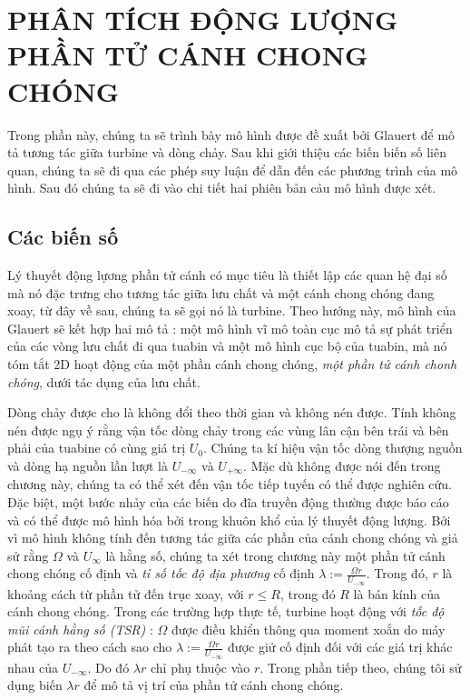 \documentclass[a4paper,twoside,13pt]{extbook}
\begin{document}
\chapter{PHÂN TÍCH ĐỘNG LƯỢNG PHẦN TỬ CÁNH CHONG CHÓNG}

Trong phần này, chúng ta sẽ trình bày mô hình được đề xuất bởi Glauert để mô tả tương tác giữa turbine và dòng chảy. Sau khi giới thiệu các biến biến số liên quan, chúng ta sẽ đi qua các phép suy luận để dẫn đến các phương trình của mô hình. Sau đó chúng ta sẽ đi vào chi tiết hai phiên bản cảu mô hình được xét.

\section{Các biến số}

Lý thuyết động lựơng phần tử cánh có mục tiêu là thiết lập các quan hệ đại số mà nó đặc trưng cho tương tác giữa lưu chất và một cánh chong chóng đang xoay, từ đây về sau, chúng ta sẽ gọi nó là turbine. Theo hướng này, mô hình của Glauert sẽ kết hợp hai mô tả : một mô hình vĩ mô toàn cục mô tả sự phát triển của các vòng lưu chất đi qua tuabin và một mô hình cục bộ của tuabin, mà nó tóm tắt 2D hoạt động của một phần cánh chong chóng, \emph{một phần tử cánh chonh chóng}, dưới tác dụng của lưu chất.

Dòng chảy được cho là không đổi theo thời gian và không nén được. Tính không nén được ngụ ý rằng vận tốc dòng chảy trong các vùng lân cận bên trái và bên phải của tuabine có cùng giá trị $U_0$. Chúng ta kí hiệu vận tốc dòng thượng nguồn và dòng hạ nguồn lần lượt là $U_{-\infty}$ và $U_{+\infty}$. Mặc dù không được nói đến trong chương này, chúng ta có thể xét đến vận tốc tiếp tuyến có thể được nghiên cứu. Đặc biệt, một bước nhảy của các biến do đĩa truyền động thường được báo cáo và có thể được mô hình hóa bởi trong khuôn khổ của lý thuyết động lượng. Bởi vì mô hình không tính đến tương tác giữa các phần của cánh chong chóng và giả sử rằng $\Omega$ và $U_{\infty}$ là hằng số, chúng ta xét trong chương này một phần tử cánh chong chóng cố định và \emph{tỉ số tốc độ địa phương} cố định $\displaystyle\lambda := \frac{\Omega r}{U_{-\infty}}$. Trong đó, $r$ là khoảng cách từ phần tử đến trục xoay, với $r\le R$, trong đó $R$ là bán kính của cánh chong chóng. Trong các trường hợp thực tế, turbine hoạt động với \emph{tốc độ mũi cánh hằng số (TSR)} : $\Omega$ được điều khiển thông qua moment xoắn do máy phát tạo ra theo cách sao cho $\displaystyle\lambda := \frac{\Omega r}{U_{-\infty}}$ được giử cố định đối với các giá trị khác nhau của ${U_{-\infty}}$. Do đó $\lambda r$ chỉ  phụ thuộc vào $r$. Trong phần tiếp theo, chúng tôi sử dụng biến $\lambda r$ để mô tả vị trí của phần tử cánh chong chóng.
\end{document}

